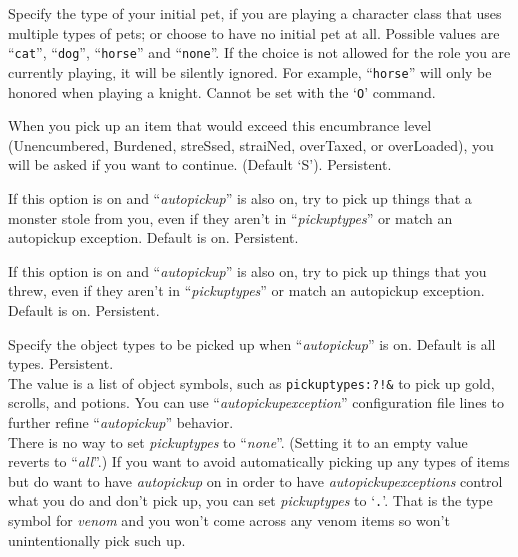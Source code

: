 \documentclass[titlepage]{article}
\begin{document}
\begin{description}[font=\mdseries\itshape]
\item[pettype]
Specify the type of your initial pet, if you are playing a character class
that uses multiple types of pets; or choose to have no initial pet at all.
Possible values are ``\texttt{cat}'', ``\texttt{dog}'', ``\texttt{horse}''
and ``\texttt{none}''.
If the choice is not allowed for the role you are currently playing,
it will be silently ignored.  For example, ``\texttt{horse}'' will only be
honored when playing a knight.
Cannot be set with the `\texttt{O}' command.
\item[pickup\textunderscore burden]
When you pick up an item that would exceed this encumbrance
level (Unencumbered, Burdened, streSsed, straiNed, overTaxed,
or overLoaded), you will be asked if you want to continue.
(Default `S').  Persistent.
\item[pickup\textunderscore stolen]
If this option is on and ``\textit{autopickup}'' is also on, try to pick up
things that a monster stole from you, even if they aren't in
``\textit{pickup\textunderscore types}'' or
match an autopickup exception.
Default is on.
Persistent.
\item[pickup\textunderscore thrown]
If this option is on and ``\textit{autopickup}'' is also on, try to pick up
things that you threw, even if they aren't in
``\textit{pickup\textunderscore types}'' or
match an autopickup exception.
Default is on.
Persistent.
\item[pickup\textunderscore types]
Specify the object types to be picked up when ``\textit{autopickup}''
is on.
Default is all types.
Persistent.
\\
The value is a list of object symbols, such as
\texttt{pickup\textunderscore types:\textdollar ?!\&} to pick up gold, scrolls, and potions.
You can use
``\textit{autopickup\textunderscore exception}''
configuration file lines to further refine ``\textit{autopickup}'' behavior.
\\
There is no way to set \textit{pickup\textunderscore types} to ``\textit{none}''.
(Setting it to an empty value reverts to ``\textit{all}''.)
If you want to avoid automatically picking up any types of items but do
want to have \textit{autopickup} on in order to have
\textit{autopickup\textunderscore exceptions} control what you do and don't pick
up, you can set \textit{pickup\textunderscore types} to `\texttt{.}'.
That is the type symbol for \textit{venom} and you won't come across
any venom items so won't unintentionally pick such up.
\item[pile\textunderscore limit]

\end{description}
\end{document}
